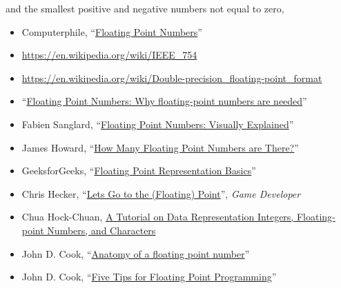 \documentclass[]{book}
\newenvironment{Shaded}{\begin{snugshade}}{\end{snugshade}}
\newcommand{\CommentTok}[1]{\textcolor[rgb]{0.56,0.35,0.01}{\textit{#1}}}
\newcommand{\NormalTok}[1]{#1}
\newcommand{\OperatorTok}[1]{\textcolor[rgb]{0.81,0.36,0.00}{\textbf{#1}}}
\providecommand{\tightlist}{%
  \setlength{\itemsep}{0pt}\setlength{\parskip}{0pt}}
\theoremstyle{plain}
\theoremstyle{remark}
\theoremstyle{definition}
\theoremstyle{definition}
\theoremstyle{definition}
\theoremstyle{remark}
\begin{document}
and the smallest positive and negative numbers not equal to zero,

\begin{Shaded}
\end{Shaded}

\begin{itemize}
\tightlist
\item
  Computerphile,
  ``\href{https://www.youtube.com/watch?v=PZRI1IfStY0}{Floating Point
  Numbers}''
\item
  \url{https://en.wikipedia.org/wiki/IEEE_754}
\item
  \url{https://en.wikipedia.org/wiki/Double-precision_floating-point_format}
\item
  ``\href{https://floating-point-gui.de/formats/fp/}{Floating Point
  Numbers: Why floating-point numbers are needed}''
\item
  Fabien Sanglard,
  ``\href{http://fabiensanglard.net/floating_point_visually_explained/}{Floating
  Point Numbers: Visually Explained}''
\item
  James Howard,
  ``\href{https://jameshoward.us/2015/09/09/how-many-floating-point-numbers-are-there/}{How
  Many Floating Point Numbers are There?}''
\item
  GeeksforGeeks,
  ``\href{https://www.geeksforgeeks.org/floating-point-representation-basics/}{Floating
  Point Representation Basics}''
\item
  Chris Hecker,
  ``\href{http://chrishecker.com/images/f/fb/Gdmfp.pdf}{Lets Go to the
  (Floating) Point}'', \emph{Game Developer}
\item
  Chua Hock-Chuan,
  \href{http://www.ntu.edu.sg/home/ehchua/programming/java/datarepresentation.html}{A
  Tutorial on Data Representation Integers, Floating-point Numbers, and
  Characters}
\item
  John D. Cook,
  ``\href{https://www.johndcook.com/blog/2009/04/06/anatomy-of-a-floating-point-number/}{Anatomy
  of a floating point number}''
\item
  John D. Cook,
  ``\href{https://www.codeproject.com/Articles/29637/Five-Tips-for-Floating-Point-Programming}{Five
  Tips for Floating Point Programming}''
\end{itemize}
\end{document}
